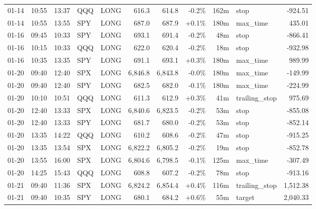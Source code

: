 \documentclass[11pt,a4paper,twoside]{article}
\begin{document}
\begin{center}
\begin{longtable}{>{\color{txtmain}}l l l l l r r r r >{\color{txtmain}}l r}
01-14 & 10:55 & 13:37 & QQQ & LONG & 616.3 & 614.8 & \textcolor{lossred}{-0.2\%} & 162m & stop & \textcolor{lossred}{-924.51} \\
01-14 & 10:55 & 13:55 & SPY & LONG & 687.0 & 687.9 & \textcolor{wingreen}{+0.1\%} & 180m & max\_time & \textcolor{wingreen}{435.01} \\
01-16 & 09:45 & 10:33 & SPY & LONG & 693.1 & 691.4 & \textcolor{lossred}{-0.2\%} & 48m & stop & \textcolor{lossred}{-866.41} \\
01-16 & 10:15 & 10:33 & QQQ & LONG & 622.0 & 620.4 & \textcolor{lossred}{-0.2\%} & 18m & stop & \textcolor{lossred}{-932.98} \\
01-16 & 10:35 & 13:35 & SPY & LONG & 691.1 & 693.1 & \textcolor{wingreen}{+0.3\%} & 180m & max\_time & \textcolor{wingreen}{989.99} \\
01-20 & 09:40 & 12:40 & SPX & LONG & 6,846.8 & 6,843.8 & \textcolor{lossred}{-0.0\%} & 180m & max\_time & \textcolor{lossred}{-149.99} \\
01-20 & 09:40 & 12:40 & SPY & LONG & 682.5 & 682.0 & \textcolor{lossred}{-0.1\%} & 180m & max\_time & \textcolor{lossred}{-224.99} \\
01-20 & 10:10 & 10:51 & QQQ & LONG & 611.3 & 612.9 & \textcolor{wingreen}{+0.3\%} & 41m & trailing\_stop & \textcolor{wingreen}{975.69} \\
01-20 & 12:40 & 13:33 & SPX & LONG & 6,840.6 & 6,823.5 & \textcolor{lossred}{-0.2\%} & 53m & stop & \textcolor{lossred}{-855.08} \\
01-20 & 12:40 & 13:33 & SPY & LONG & 681.7 & 680.0 & \textcolor{lossred}{-0.2\%} & 53m & stop & \textcolor{lossred}{-852.14} \\
01-20 & 13:35 & 14:22 & QQQ & LONG & 610.2 & 608.6 & \textcolor{lossred}{-0.2\%} & 47m & stop & \textcolor{lossred}{-915.25} \\
01-20 & 13:35 & 13:54 & SPX & LONG & 6,822.2 & 6,805.2 & \textcolor{lossred}{-0.2\%} & 19m & stop & \textcolor{lossred}{-852.78} \\
01-20 & 13:55 & 16:00 & SPX & LONG & 6,804.6 & 6,798.5 & \textcolor{lossred}{-0.1\%} & 125m & max\_time & \textcolor{lossred}{-307.49} \\
01-20 & 14:25 & 15:43 & QQQ & LONG & 608.8 & 607.2 & \textcolor{lossred}{-0.2\%} & 78m & stop & \textcolor{lossred}{-913.16} \\
01-21 & 09:40 & 11:36 & SPX & LONG & 6,824.2 & 6,854.4 & \textcolor{wingreen}{+0.4\%} & 116m & trailing\_stop & \textcolor{wingreen}{1,512.38} \\
01-21 & 09:40 & 10:35 & SPY & LONG & 680.1 & 684.2 & \textcolor{wingreen}{+0.6\%} & 55m & target & \textcolor{wingreen}{2,040.33} \\

\end{longtable}
\end{center}
\end{document}
